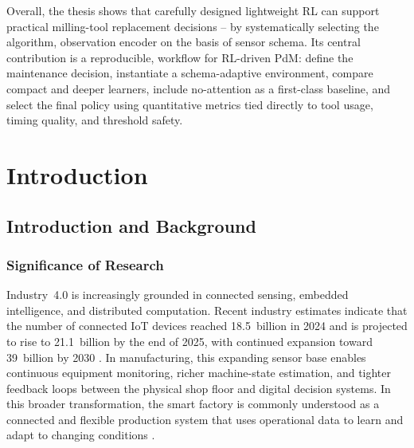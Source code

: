 \documentclass[12pt,oneside]{book}
\begin{document}
Overall, the thesis shows that carefully designed lightweight RL can support practical milling-tool replacement decisions -- by systematically selecting the algorithm, observation encoder on the basis of sensor schema. Its central contribution is a reproducible, workflow for RL-driven PdM: define the maintenance decision, instantiate a schema-adaptive environment, compare compact and deeper learners, include no-attention as a first-class baseline, and select the final policy using quantitative metrics tied directly to tool usage, timing quality, and threshold safety.

\tableofcontents
\listoffigures
\listoftables

\mainmatter
\onehalfspacing


\chapter{Introduction}\label{ch:introduction}

\section{Introduction and Background}

\subsection{Significance of Research}

Industry~4.0 is increasingly grounded in connected sensing, embedded intelligence, and distributed computation. Recent industry estimates indicate that the number of connected IoT devices reached 18.5~billion in 2024 and is projected to rise to 21.1~billion by the end of 2025, with continued expansion toward 39~billion by 2030 \citep{IoTAnalytics2025}. In manufacturing, this expanding sensor base enables continuous equipment monitoring, richer machine-state estimation, and tighter feedback loops between the physical shop floor and digital decision systems. In this broader transformation, the smart factory is commonly understood as a connected and flexible production system that uses operational data to learn and adapt to changing conditions \citep{Deloitte2025Survey}.
\end{document}
